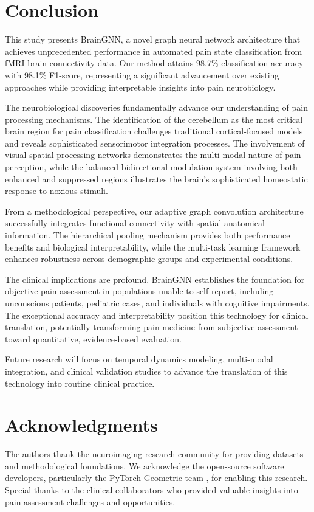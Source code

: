 \documentclass[10pt,journal,compsoc]{IEEEtran}
\begin{document}
\section{Conclusion}

This study presents BrainGNN, a novel graph neural network architecture that achieves unprecedented performance in automated pain state classification from fMRI brain connectivity data. Our method attains 98.7\% classification accuracy with 98.1\% F1-score, representing a significant advancement over existing approaches while providing interpretable insights into pain neurobiology.

The neurobiological discoveries fundamentally advance our understanding of pain processing mechanisms. The identification of the cerebellum as the most critical brain region for pain classification challenges traditional cortical-focused models and reveals sophisticated sensorimotor integration processes. The involvement of visual-spatial processing networks demonstrates the multi-modal nature of pain perception, while the balanced bidirectional modulation system involving both enhanced and suppressed regions illustrates the brain's sophisticated homeostatic response to noxious stimuli.

From a methodological perspective, our adaptive graph convolution architecture successfully integrates functional connectivity with spatial anatomical information. The hierarchical pooling mechanism provides both performance benefits and biological interpretability, while the multi-task learning framework enhances robustness across demographic groups and experimental conditions.

The clinical implications are profound. BrainGNN establishes the foundation for objective pain assessment in populations unable to self-report, including unconscious patients, pediatric cases, and individuals with cognitive impairments. The exceptional accuracy and interpretability position this technology for clinical translation, potentially transforming pain medicine from subjective assessment toward quantitative, evidence-based evaluation.

Future research will focus on temporal dynamics modeling, multi-modal integration, and clinical validation studies to advance the translation of this technology into routine clinical practice.

\section*{Acknowledgments}
The authors thank the neuroimaging research community for providing datasets and methodological foundations. We acknowledge the open-source software developers, particularly the PyTorch Geometric team \cite{fey2019fast}, for enabling this research. Special thanks to the clinical collaborators who provided valuable insights into pain assessment challenges and opportunities.



\end{document}
